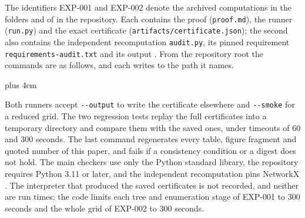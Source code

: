 The identifiers EXP-001 and EXP-002 denote the archived computations in the folders  and  of  in the repository.
Each contains the proof (\texttt{proof.md}), the runner (\texttt{run.py}) and the exact certificate (\texttt{artifacts/certificate.json}); the second also contains the independent recomputation \texttt{audit.py}, its pinned requirement \texttt{requirements-audit.txt} and its output .
From the repository root the commands are as follows, and each writes to the path it names.
{\rightskip=0pt plus 4em\relax
\begin{quote}\footnotesize\ttfamily\raggedright
{} \par
{} \par
{}     \par
{} \par
{}    \par
{} \par
\end{quote}
\par}
Both runners accept \texttt{-{}-output} to write the certificate elsewhere and \texttt{-{}-smoke} for a reduced grid.
The two regression tests replay the full certificates into a temporary directory and compare them with the saved ones, under timeouts of 60 and 300 seconds.
The last command regenerates every table, figure fragment and quoted number of this paper, and fails if a consistency condition or a digest does not hold.
The main checkers use only the Python standard library, the repository requires Python 3.11 or later, and the independent recomputation pins NetworkX \NXVersion.
The interpreter that produced the saved certificates is not recorded, and neither are run times; the code limits each tree and enumeration stage of EXP-001 to 300 seconds and the whole grid of EXP-002 to 300 seconds.

